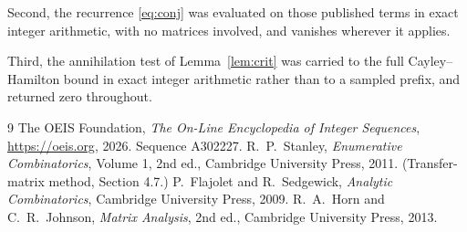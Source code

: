 \documentclass[11pt,a4paper]{article}
\theoremstyle{plain}
\theoremstyle{definition}
\begin{document}
Second, the recurrence \eqref{eq:conj} was evaluated on those published terms in exact
integer arithmetic, with no matrices involved, and vanishes wherever it applies.

Third, the annihilation test of Lemma~\ref{lem:crit} was carried to the full
Cayley--Hamilton bound in exact integer arithmetic rather than to a sampled prefix, and
returned zero throughout.

\begin{thebibliography}{9}
 The OEIS Foundation, \emph{The On-Line Encyclopedia of Integer
Sequences}, \url{https://oeis.org}, 2026. Sequence A302227.
 R.~P.~Stanley, \emph{Enumerative Combinatorics}, Volume 1, 2nd ed.,
Cambridge University Press, 2011. (Transfer-matrix method, Section 4.7.)
 P.~Flajolet and R.~Sedgewick, \emph{Analytic Combinatorics}, Cambridge
University Press, 2009.
 R.~A.~Horn and C.~R.~Johnson, \emph{Matrix Analysis}, 2nd ed., Cambridge
University Press, 2013.
\end{thebibliography}
\end{document}
